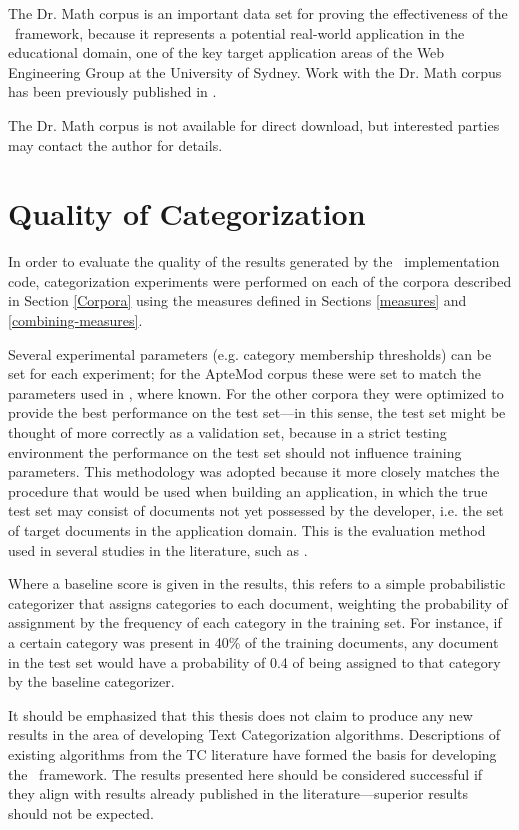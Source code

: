 The Dr. Math corpus is an important data set for proving the
effectiveness of the \aicat\ framework, because it represents a
potential real-world application in the educational domain, one of the key
target application areas of the Web Engineering Group at the
University of Sydney. Work with the Dr. Math corpus has been
previously published in \cite{williams:03}.

The Dr. Math corpus is not available for direct download, but interested
parties may contact the author for details.


\section{Quality of Categorization}
\label{Quality}

In order to evaluate the quality of the results generated by the
\aicat\ implementation code, categorization experiments were performed
on each of the corpora described in Section \ref{Corpora} using the
measures defined in Sections \ref{measures} and
\ref{combining-measures}.

Several
experimental parameters (e.g. category membership thresholds) can be
set for each experiment; for the ApteMod corpus these were set to
match the parameters used in \cite{yang:99}, where known.  For the
other corpora they were optimized to provide the
best performance on the test set---in this sense, the test set might
be thought of more correctly as a validation set, because in a strict
testing environment the performance on the test set should not
influence training parameters.  This methodology was adopted because
it more closely matches the procedure that would be used when building
an application, in which the true test set may consist of documents
not yet possessed by the developer, i.e. the set of target documents
in the application domain.  This is the evaluation method used in
several studies in the literature, such as \cite{joachims:98}.

Where a baseline score is given in the results, this refers to a
simple probabilistic categorizer that assigns categories to each
document, weighting the probability of assignment by the frequency of
each category in the training set.  For instance, if a certain
category was present in 40\% of the training documents, any document
in the test set would have a probability of 0.4 of being assigned to
that category by the baseline categorizer.  

It should be emphasized that this thesis does not claim to produce any
new results in the area of developing Text Categorization algorithms.
Descriptions of existing algorithms from the TC literature have formed
the basis for developing the \aicat\ framework.  The results presented
here should be considered successful if they align with results
already published in the literature---superior results should not be
expected.

